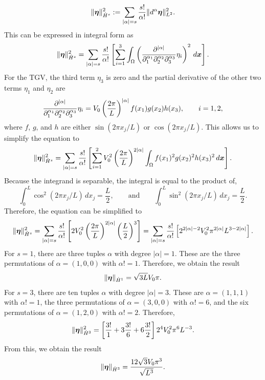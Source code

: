 {\begin{equation*}
\|{\boldsymbol \eta}\|_{\dot{H}^s}^2 := \sum_{|\alpha|=s}\frac{s!}{\alpha!}\|d^\alpha{\boldsymbol \eta}\|_{L^2}^2.
\end{equation*}
This can be expressed in integral form as
\begin{equation*}
\|{\boldsymbol \eta}\|_{\dot{H}^s}^2 = \sum_{|\alpha|=s}\frac{s!}{\alpha!}\left[ \sum_{i=1}^3 \int_{\Omega} \left( \frac{\partial^{|\alpha|}}{\partial_1^{\alpha_1}\partial_2^{\alpha_2}\partial_3^{\alpha_3}} \eta_i \right)^2\,d\boldsymbol x \right].
\end{equation*}
For the TGV, the third term $\eta_3$ is zero and the partial derivative of the other two terms $\eta_1$ and $\eta_2$ are
\begin{equation*}
\frac{\partial^{|\alpha|}}{\partial_1^{\alpha_1}\partial_2^{\alpha_2}\partial_3^{\alpha_3}} \eta_i = V_0\left(\frac{2\pi}{L}\right)^{|\alpha|}f(x_1)g(x_2)h(x_3), \qquad i=1,2,
\end{equation*}
where $f$, $g$, and $h$ are either $\sin(2\pi x_j/L)$ or $\cos(2\pi x_j/L)$. This allows us to simplify the equation to
\begin{equation*}
\|{\boldsymbol \eta}\|_{\dot{H}^s}^2 = \sum_{|\alpha|=s}\frac{s!}{\alpha!}\left[ \sum_{i=1}^2 V_0^2\left(\frac{2\pi}{L}\right)^{2|\alpha|} \int_{\Omega}  f(x_1)^2g(x_2)^2h(x_3)^2\,d\boldsymbol x \right].
\end{equation*}
Because the integrand is separable, the integral is equal to the product of,
\begin{equation*}
\int_{0}^L \cos^2(2\pi x_j/L)\, dx_j = \frac{L}{2}, \qquad \text{and} \qquad \int_{0}^L \sin^2(2\pi x_j/L)\, dx_j = \frac{L}{2}.
\end{equation*}
Therefore, the equation can be simplified to
\begin{equation*}
\|{\boldsymbol \eta}\|_{\dot{H}^s}^2 = \sum_{|\alpha|=s}\frac{s!}{\alpha!}\left[ 2V_0^2\left(\frac{2\pi}{L}\right)^{2|\alpha|} \left(\frac{L}{2}\right)^3 \right] = \sum_{|\alpha|=s}\frac{s!}{\alpha!}\left[ 2^{2|\alpha|-2}V_0^2\pi^{2|\alpha|}L^{3-2|\alpha|} \right].
\end{equation*}
For $s=1$, there are three tuples $\alpha$ with degree $|\alpha|=1$. These are the three permutations of $\alpha=(1,0,0)$ with $\alpha! = 1$. Therefore, we obtain the result
\begin{equation*}
\|{\boldsymbol \eta}\|_{\dot{H}^1} = \sqrt{3L}V_0\pi.
\end{equation*} 
For $s=3$, there are ten tuples $\alpha$ with degree $|\alpha|=3$. These are $\alpha=(1,1,1)$ with $\alpha!=1$, the three permutations of $\alpha=(3,0,0)$ with $\alpha!=6$, and the six permutations of $\alpha=(1,2,0)$ with $\alpha!=2$.  Therefore,
\begin{equation*}
\|{\boldsymbol \eta}\|_{\dot{H}^3}^2 = \left[ \frac{3!}{1} + 3\frac{3!}{6} + 6\frac{3!}{2}\right] 2^{4}V_0^2\pi^{6}L^{-3}.
\end{equation*} 
From this, we obtain the result
\begin{equation*}
\|{\boldsymbol \eta}\|_{\dot{H}^3} = \frac{12\sqrt{3}V_0\pi^3}{\sqrt{L^3}}.
\end{equation*} 
 
}
